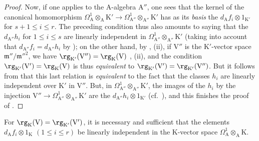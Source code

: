 \begin{proof}
Now, if one applies  to the $\mathrm{A}$-algebra $\mathrm{A}''$, one sees that the kernel of the canonical homomorphism $\Omega^1_\mathrm{A}\otimes_\mathrm{A}\mathrm{K}'\to\Omega^1_{\mathrm{A}''}\otimes_{\mathrm{A}''}\mathrm{K}'$ has as its \emph{basis} the $d_\mathrm{A}f_i\otimes 1_{\mathrm{K}'}$ for $s+1\leq i\leq r$.
The preceding condition thus also amounts to saying that the $d_{\mathrm{A}''}h_i$ for $1\leq i\leq s$ are linearly independent in $\Omega^1_{\mathrm{A}''}\otimes_{\mathrm{A}''}\mathrm{K}'$ (taking into account that $d_{\mathrm{A}''}f_i=d_{\mathrm{A}''}h_i$ by );
on the other hand, by , (ii), if $\mathrm{V}''$ is the $\mathrm{K}'$-vector space $\mathfrak{m}''/\mathfrak{m}''^2$, we have $\rg_{\mathrm{K}'}(\mathrm{V}'')=\rg_\mathrm{K}(\mathrm{V})$ , (ii), and the condition $\rg_{\mathrm{K}'}(\mathrm{V}')=\rg_\mathrm{K}(\mathrm{V})$ is thus \emph{equivalent} to $\rg_{\mathrm{K}'}(\mathrm{V}')=\rg_{\mathrm{K}'}(\mathrm{V}'')$.
But it follows from  that this last relation is \emph{equivalent} to the fact that the classes $h_i$
are linearly independent over $\mathrm{K}'$ in $\mathrm{V}''$.
But, in $\Omega^1_{\mathrm{A}''}\otimes_{\mathrm{A}''}\mathrm{K}'$, the images of the $h_i$ by the injection $\mathrm{V}''\to\Omega^1_{\mathrm{A}''}\otimes_{\mathrm{A}''}\mathrm{K}'$  are the $d_{\mathrm{A}''}h_i\otimes 1_{\mathrm{K}'}$ (cf.~), and this finishes the proof of .
\end{proof}

\begin{corollary}[22.4.7.4]
\label{0.22.4.7.4}
For $\rg_\mathrm{K}(\mathrm{V})=\rg_{\mathrm{K}'}(\mathrm{V}')$, it is necessary and sufficient that the elements $d_\mathrm{A}f_i\otimes 1_\mathrm{K}$ $(1\leq i\leq r)$ be linearly independent in the $\mathrm{K}$-vector space $\Omega^1_\mathrm{A}\otimes_\mathrm{A}\mathrm{K}$.
\end{corollary}

